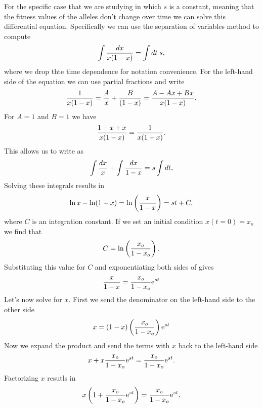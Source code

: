 For the specific case that we are studying in which $s$ is a constant, meaning
that the fitness values of the alleles don't change over time we can solve this
differential equation. Specifically we can use the separation of variables
method to compute
\begin{equation}
  \int {dx \over x(1 - x)} = \int dt \;s,
  \label{eq_sep_var}
\end{equation}
where we drop thte time dependence for notation convenience. For the left-hand
side of the equation we can use partial fractions and write
\begin{equation}
  {1 \over x(1 - x)} = {A \over x} + {B \over (1 - x)}
  = {A - Ax + Bx \over x(1 - x)}.
\end{equation}
For $A = 1$ and $B = 1$ we have
\begin{equation}
  {1 - x + x \over x(1 - x)} = {1 \over x(1 - x)}.
\end{equation}
This allows us to write  as 
\begin{equation}
  \int {dx \over x} + \int {dx \over 1 - x} = s \int dt.
\end{equation}
Solving these integrals results in
\begin{equation}
  \ln x - \ln(1 - x) = \ln\left( {x \over 1 - x} \right) 
  = s t + C,
  \label{eq_sep_var_sol}
\end{equation}
where $C$ is an integration constant. If we set an initial condition $x(t = 0)
= x_o$ we find that
\begin{equation}
  C = \ln \left( {x_o \over 1 - x_o} \right).
\end{equation}
Substituting this value for $C$ and exponentiating both sides of
 gives
\begin{equation}
  {x \over 1 - x} = {x_o \over 1 - x_o} \mathrm{e}^{s t}
\end{equation}
Let's now solve for $x$. First we send the denominator on the left-hand side to
the other side
\begin{equation}
  x = (1 - x)\left( x_o \over 1 - x_o \right)\mathrm{e}^{st}
\end{equation}
Now we expand the product and send the terms with $x$ back to the left-hand
side
\begin{equation}
  x + x {x_o \over 1 - x_o}\mathrm{e}^{st} = {x_o \over 1 - x_o}\mathrm{e}^{st}.
\end{equation}
Factorizing $x$ resutls in
\begin{equation}
  x \left( 1 + {x_o \over 1 - x_o}\mathrm{e}^{st} \right) = {x_o \over 1 - x_o}\mathrm{e}^{st}.
\end{equation}
